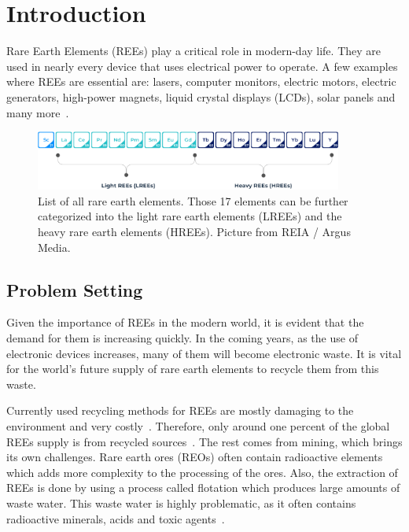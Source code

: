 \chapter{Introduction}

Rare Earth Elements (REEs) play a critical role in modern-day life.
They are used in nearly every device that uses electrical power to operate.
A few examples where REEs are essential are: lasers, computer monitors, electric motors, electric generators, high-power magnets, liquid crystal displays (LCDs), solar panels and many more~\cite{usageofrees}.

\begin{figure}[H]
    \centering
    \includegraphics[width=0.9\textwidth]{./media/images/rees_periodic_table}
    \caption{List of all rare earth elements. Those 17 elements can be further categorized into the light rare earth elements (LREEs) and the heavy rare earth elements (HREEs). Picture from REIA / Argus Media.}
    \label{fig:list_rees}
\end{figure}


\section{Problem Setting\authorA{}}

Given the importance of REEs in the modern world, it is evident that the demand for them is increasing quickly.
In the coming years, as the use of electronic devices increases, many of them will become electronic waste.
It is vital for the world's future supply of rare earth elements to recycle them from this waste.

Currently used recycling methods for REEs are mostly damaging to the environment and very costly~\cite{recyclingcurrent}.
Therefore, only around one percent of the global REEs supply is from recycled sources~\cite{currentrecyclingnumbers}.
The rest comes from mining, which brings its own challenges.
Rare earth ores (REOs) often contain radioactive elements which adds more complexity to the processing of the ores.
Also, the extraction of REEs is done by using a process called flotation which produces large amounts of waste water.
This waste water is highly problematic, as it often contains radioactive minerals, acids and toxic agents~\cite{reeenvimpact}.

